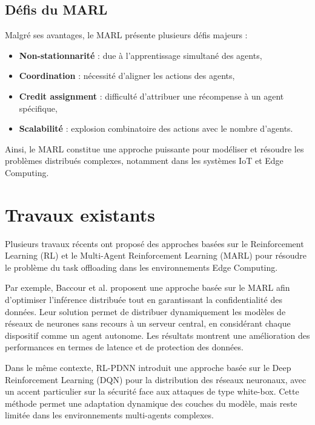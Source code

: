 \documentclass[12pt,a4paper]{report}
\begin{document}
\subsection{Défis du MARL}

Malgré ses avantages, le MARL présente plusieurs défis majeurs \cite{albrecht2024marl}:

\begin{itemize}
    \item \textbf{Non-stationnarité} : due à l’apprentissage simultané des agents,
    \item \textbf{Coordination} : nécessité d’aligner les actions des agents,
    \item \textbf{Credit assignment} : difficulté d’attribuer une récompense à un agent spécifique,
    \item \textbf{Scalabilité} : explosion combinatoire des actions avec le nombre d’agents.
\end{itemize}

Ainsi, le MARL constitue une approche puissante pour modéliser et résoudre les problèmes distribués complexes, notamment dans les systèmes IoT et Edge Computing.

\section{Travaux existants}

Plusieurs travaux récents ont proposé des approches basées sur le Reinforcement Learning (RL) et le Multi-Agent Reinforcement Learning (MARL) pour résoudre le problème du task offloading dans les environnements Edge Computing.

Par exemple, Baccour et al. \cite{baccour2024} proposent une approche basée sur le MARL afin d’optimiser l’inférence distribuée tout en garantissant la confidentialité des données. Leur solution permet de distribuer dynamiquement les modèles de réseaux de neurones sans recours à un serveur central, en considérant chaque dispositif comme un agent autonome. Les résultats montrent une amélioration des performances en termes de latence et de protection des données.

Dans le même contexte, RL-PDNN \cite{rlpdnn2021} introduit une approche basée sur le Deep Reinforcement Learning (DQN) pour la distribution des réseaux neuronaux, avec un accent particulier sur la sécurité face aux attaques de type white-box. Cette méthode permet une adaptation dynamique des couches du modèle, mais reste limitée dans les environnements multi-agents complexes.
\end{document}
